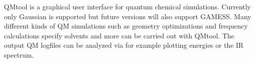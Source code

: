 QMtool is a graphical user interface for quantum chemical simulations. Currently only Gaussian is supported but future versions will also support GAMESS. Many different kinds of QM simulations such as geometry optimizations and frequency calculations specify solvents and more can be carried out with QMtool. The output QM logfiles can be analyzed via for example plotting energies or the IR spectrum. 